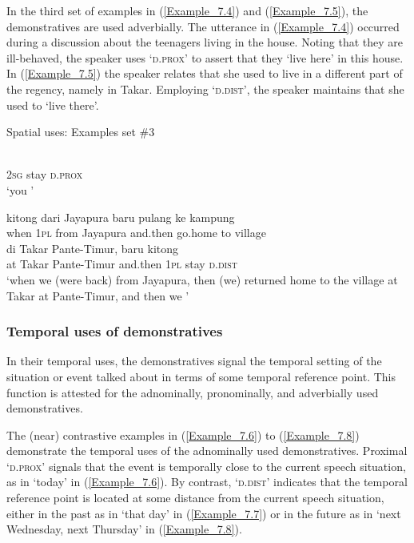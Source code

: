 {In the third set of examples in (\ref{Example_7.4}) and (\ref{Example_7.5}), the demonstratives are used adverbially. The utterance in (\ref{Example_7.4}) occurred during a discussion about the teenagers living in the house. Noting that they are ill-behaved, the speaker uses  ‘\textsc{d.prox}’ to assert that they  ‘live here’ in this house. In (\ref{Example_7.5}) the speaker relates that she used to live in a different part of the regency, namely in Takar. Employing  ‘\textsc{d.dist}’, the speaker maintains that she used to  ‘live there’.


\begin{styleExampleTitle}
Spatial uses: Examples set \#3
\end{styleExampleTitle}

\ea
\label{Example_7.4}
 {} {}\\ %
 \textsc{2sg}  stay  \textsc{d.prox}\\
\glt 
‘you ’ \textstyleExampleSource{[081115-001b-Cv.0030]}
\z

\ea
\label{Example_7.5}
 {{kitong}} {dari} {{Jayapura}} {{baru}} {{pulang}} {ke} {kampung}\\ %
 {when}  {\textsc{1pl}}  from  {Jayapura}  {and.then}  {go.home}  to  village\\
\gll di  {Takar}  {Pante-Timur,}  {baru}  {kitong}    {}\\
 at  {Takar}  {Pante-Timur}  {and.then}  {\textsc{1pl}}  stay  {\textsc{d.dist}}\\
\glt
‘when we (were back) from Jayapura, then (we) returned home to the village at Takar at Pante-Timur, and then we ’ \textstyleExampleSource{[081006-022-CvEx.0159]}
\z



\subsubsection[Temporal uses of demonstratives]{Temporal uses of demonstratives}
\label{Para_7.1.2.2}
In their temporal uses, the demonstratives signal the temporal setting of the situation or event talked about in terms of some temporal reference point. This function is attested for the adnominally, pronominally, and adverbially used demonstratives.



The (near) contrastive examples in (\ref{Example_7.6}) to (\ref{Example_7.8}) demonstrate the temporal uses of the adnominally used demonstratives. Proximal  ‘\textsc{d.prox}’ signals that the event is temporally close to the current speech situation, as in  ‘today’ in (\ref{Example_7.6}). By contrast,  ‘\textsc{d.dist}’ indicates that the temporal reference point is located at some distance from the current speech situation, either in the past as in  ‘that day’ in (\ref{Example_7.7}) or in the future as in  ‘next Wednesday, next Thursday’ in (\ref{Example_7.8}).


}

